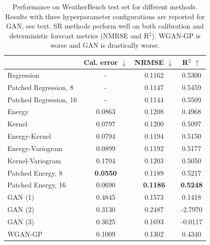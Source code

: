 \documentclass[twoside,11pt]{article}
\begin{document}
	
	\begin{table}
		\begin{center}
			\begin{tabular}{lccc}
				\toprule
				& Cal. error $ \downarrow $ & NRMSE $ \downarrow $ & R$ ^2 $ $ \uparrow $ \\
				\midrule
				Regression & - & 0.1162  &  0.5300    \\
				Patched Regression, 8 & - & 0.1147  &  0.5459    \\
				Patched Regression, 16 & - & 0.1144  &  0.5509    \\
				\midrule
				Energy & 0.0863  & 0.1208   &  0.4968  \\
				Kernel & 0.0797  & 0.1200   &  0.5097  \\
				Energy-Kernel &0.0794  & 0.1194   &  0.5150   \\
				Energy-Variogram & 0.0899  & 0.1192   &  0.5177   \\
				Kernel-Variogram &0.1704  & 0.1203   &  0.5050   \\
				Patched Energy, 8 & \textbf{0.0550}  & 0.1189   &  0.5217  \\
				Patched Energy, 16 & 0.0690  & \textbf{0.1186}   &  \textbf{0.5248}   \\
				GAN (1) & 0.4845 & 0.1573 & 0.1418   \\
				GAN (2) & 	0.3130  & 0.2487   &  -2.7970  \\ 
				GAN (3) & 0.3625  & 0.1693   &  -0.0117   \\ 
				WGAN-GP & 0.1009  & 0.1302   &  0.4340   \\
				\bottomrule
			\end{tabular}
		\end{center}
		\caption{Performance on WeatherBench test set for different methods. Results with three hyperparameter configurations are reported for GAN, see text. SR methods perform well on both calibration and deterministic forecast metrics (NMRSE and R$ ^2 $). WGAN-GP is worse and GAN is drastically worse.}	\label{tab:res_weatherbench}
	\end{table}
	
	
	
	
	
	
	
	
	
	
	
	
	
	
	
	
\end{document}
